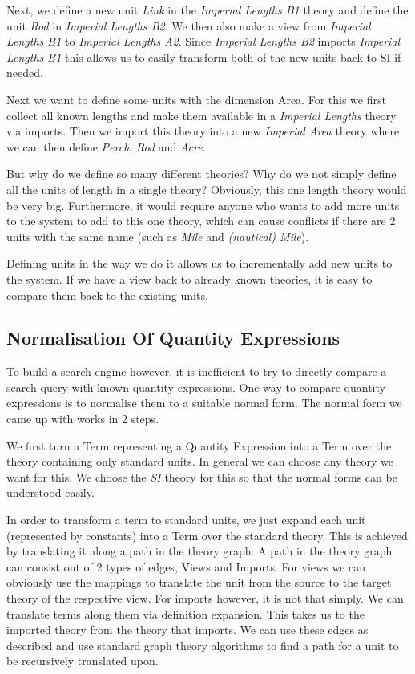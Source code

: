 Next, we define a new unit \textit{Link} in the \textit{Imperial Lengths B1} theory and define the unit \textit{Rod} in \textit{Imperial Lengths B2}. We then also make a view from \textit{Imperial Lengths B1} to \textit{Imperial Lengths A2}. Since \textit{Imperial Lengths B2} imports \textit{Imperial Lengths B1} this allows us to easily transform both of the new units back to SI if needed.

Next we want to define some units with the dimension Area. For this we first collect all known lengths and make them available in a \textit{Imperial Lengths} theory via imports. Then we import this theory into a new \textit{Imperial Area} theory where we can then define \textit{Perch}, \textit{Rod} and \textit{Acre}.

But why do we define so many different theories? Why do we not simply define all the units of length in a single theory? Obviously, this one length theory would be very big. Furthermore, it would require anyone who wants to add more units to the system to add to this one theory, which can cause conflicts if there are 2 units with the same name (such as \textit{Mile} and \textit{(nautical) Mile}).

Defining units in the way we do it allows us to incrementally add new units to the system. If we have a view back to already known theories, it is easy to compare them back to the existing units.

\subsection{Normalisation Of Quantity Expressions}

To build a search engine however, it is inefficient to try to directly compare a search query with known quantity expressions. One way to compare quantity expressions is to normalise them to a suitable normal form. The normal form we came up with works in 2 steps.

We first turn a Term representing a Quantity Expression into a Term over the theory containing only standard units. In general we can choose any theory we want for this. We choose the \textit{SI} theory for this so that the normal forms can be understood easily.

In order to transform a term to standard units, we just expand each unit (represented by constants) into a Term over the standard theory. This is achieved by translating it along a path in the theory graph. A path in the theory graph can consist out of 2 types of edges, Views and Imports. For views we can obviously use the mappings to translate the unit from the source to the target theory of the respective view. For imports however, it is not that simply. We can translate terms along them via definition expansion. This takes us to the imported theory from the theory that imports. We can use these edges as described and use standard graph theory algorithms to find a path for a unit to be recursively translated upon.

